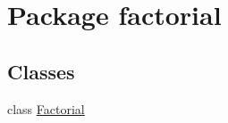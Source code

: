 \hypertarget{namespacefactorial}{}\section{Package factorial}
\label{namespacefactorial}
\subsection*{Classes}
\begin{DoxyCompactItemize}
\item 
class \mbox{\hyperlink{classfactorial_1_1_factorial}{Factorial}}
\end{DoxyCompactItemize}
